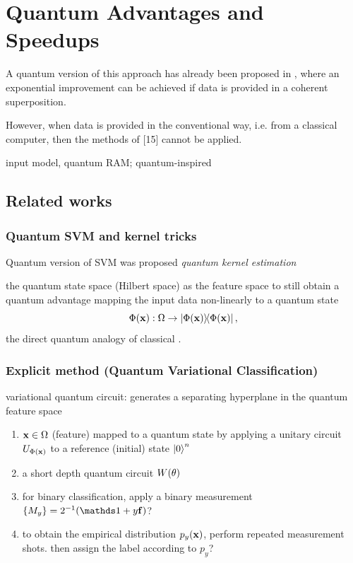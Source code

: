 \section{Quantum Advantages and Speedups}\label{sec:speedup}
A quantum version of this approach has already been proposed in \cite{rebentrostQuantumSupportVector2014},
where an exponential improvement can be achieved if data is provided in a coherent superposition. 
\begin{remark}
	However, when data is provided in the conventional way, i.e. from a classical computer, then the methods of [15] cannot be applied.
\end{remark}
input model, quantum RAM;
quantum-inspired \cite{tangQuantuminspiredClassicalAlgorithm2019}

\subsection{Related works}\label{sec:qke}

\subsubsection{Quantum SVM and kernel tricks}
Quantum version of SVM was proposed \cite{rebentrostQuantumSupportVector2014}
\emph{quantum kernel estimation}
\cite{schuldQuantumMachineLearning2019}
\cite{havlicekSupervisedLearningQuantum2019}
\begin{definition}\label{def:quantum_feature_map}
	the quantum state space (Hilbert space) as the feature space to still obtain a quantum advantage
	mapping the input data non-linearly to a quantum state 
	\begin{equation}
		\Phi(\vbx): \Omega \to \dyad{\Phi(\vbx)},
		\label{eq:quantum_feature_map}
	\end{equation}
the direct quantum analogy of classical .
\end{definition}

\subsubsection{Explicit method (Quantum Variational Classification)}
variational quantum circuit: generates a separating hyperplane in the quantum feature space
\begin{enumerate}
	\item $\vb{x}\in\Omega$ (feature) mapped to a quantum state by applying a unitary circuit $U_{\Phi(\vb{x})}$ to a reference (initial) state $\ket{0}^n$
	\item a short depth quantum circuit $W(\vb{\theta})$
	\item for binary classification, apply a binary measurement $\qty{M_y}=2^{-1}(\identity + y \vb{f})$?
	\item to obtain the empirical distribution $p_y(\vb{x})$, perform repeated measurement shots.
	then assign the label according to $p_y$?
\end{enumerate}

